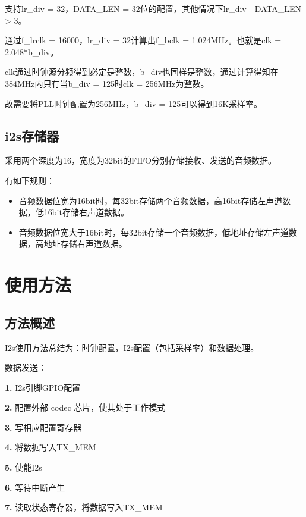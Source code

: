\documentclass[
  12pt,
]{book}
\begin{document}
支持lr\_div = 32，DATA\_LEN = 32位的配置，其他情况下lr\_div - DATA\_LEN \textgreater{} 3。

通过f\_lrclk = 16000，lr\_div = 32计算出f\_bclk = 1.024MHz。也就是clk = 2.048*b\_div。

clk通过时钟源分频得到必定是整数，b\_div也同样是整数，通过计算得知在384MHz内只有当b\_div = 125时clk = 256MHz为整数。

故需要将PLL时钟配置为256MHz，b\_div = 125可以得到16K采样率。

\hypertarget{i2sux5b58ux50a8ux5668}{%
\subsection{i2s存储器}\label{i2sux5b58ux50a8ux5668}}

采用两个深度为16，宽度为32bit的FIFO分别存储接收、发送的音频数据。

有如下规则：

\begin{itemize}
\item
  音频数据位宽为16bit时，每32bit存储两个音频数据，高16bit存储左声道数据，低16bit存储右声道数据。
\item
  音频数据位宽大于16bit时，每32bit存储一个音频数据，低地址存储左声道数据，高地址存储右声道数据。
\end{itemize}

\hypertarget{ux4f7fux7528ux65b9ux6cd5-1}{%
\section{使用方法}\label{ux4f7fux7528ux65b9ux6cd5-1}}

\hypertarget{ux65b9ux6cd5ux6982ux8ff0-1}{%
\subsection{方法概述}\label{ux65b9ux6cd5ux6982ux8ff0-1}}

I2s使用方法总结为：时钟配置，I2s配置（包括采样率）和数据处理。

数据发送：

\textbf{1.} I2s引脚GPIO配置

\textbf{2.} 配置外部 codec 芯片，使其处于工作模式

\textbf{3.} 写相应配置寄存器

\textbf{4.} 将数据写入TX\_MEM

\textbf{5.} 使能I2s

\textbf{6.} 等待中断产生

\textbf{7.} 读取状态寄存器，将数据写入TX\_MEM
\end{document}
